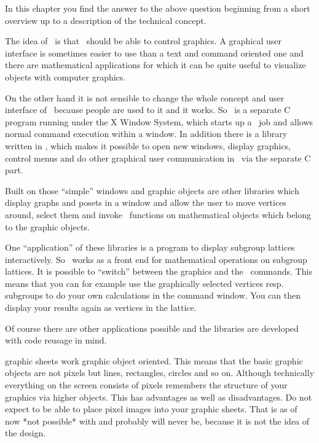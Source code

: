 
In this chapter you find the answer to the above question beginning from a
short overview up to a description of the technical concept.


The idea of \XGAP~is that \GAP~should be able to control graphics. A
graphical user interface is sometimes easier to use than a text and
command oriented one and there are mathematical applications for which it
can be quite useful to visualize objects with computer graphics.

On the other hand it is not sensible to change the whole concept and user
interface of \GAP~because people are used to it and it works. So \XGAP~is a 
separate C program running under the X Window System, which starts up a
\GAP~job and allows normal command execution within a window. In addition
there is a library written in \GAP, which makes it possible to open new
windows, display graphics, control menus and do other graphical user
communication in \GAP~via the separate C part.

Built on those ``simple'' windows and graphic objects are other libraries
which display graphs and posets in a window and allow the user to move
vertices around, select them and invoke \GAP~functions on mathematical
objects which belong to the graphic objects.

One ``application'' of these libraries is a program to display subgroup
lattices interactively. So \XGAP~works as a front end for mathematical
operations on subgroup lattices. It is possible to ``switch'' between the
graphics and the \GAP~commands. This means that you can for example use the 
graphically selected vertices resp. subgroups to do your own calculations
in the command window. You can then display your results again as vertices
in the lattice.

Of course there are other applications possible and the libraries are
developed with code reusage in mind.



{\XGAP} graphic sheets work graphic object oriented. This means that the
basic graphic objects are not pixels but lines, rectangles, circles and so
on. Although technically everything on the screen consists of pixels
{\XGAP} remembers the structure of your graphics via higher objects. This
has advantages as well as disadvantages. Do not expect to be able to
place pixel images into your {\XGAP} graphic sheets. That is as of now
*not possible* with {\XGAP} and probably will never be, because it is not
the idea of the design. 

